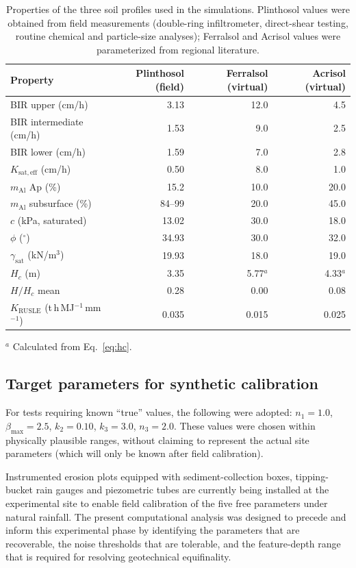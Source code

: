 \documentclass[preprint,review,12pt,authoryear]{elsarticle}
\begin{document}
\begin{table}[htbp]
\centering
\caption{Properties of the three soil profiles used in the simulations. Plinthosol values were obtained from field measurements (double-ring infiltrometer, direct-shear testing, routine chemical and particle-size analyses); Ferralsol and Acrisol values were parameterized from regional literature.}
\label{tab:profiles}
\small
\begin{tabular}{@{}l r r r@{}}
\toprule
Property & Plinthosol (field) & Ferralsol (virtual) & Acrisol (virtual) \\
\midrule
BIR upper (cm/h) & 3.13 & 12.0 & 4.5 \\
BIR intermediate (cm/h) & 1.53 & 9.0 & 2.5 \\
BIR lower (cm/h) & 1.59 & 7.0 & 2.8 \\
$K_{\mathrm{sat,eff}}$ (cm/h) & 0.50 & 8.0 & 1.0 \\
$m_{\mathrm{Al}}$ Ap (\%) & 15.2 & 10.0 & 20.0 \\
$m_{\mathrm{Al}}$ subsurface (\%) & 84--99 & 20.0 & 45.0 \\
$c$ (kPa, saturated) & 13.02 & 30.0 & 18.0 \\
$\phi$ ($^\circ$) & 34.93 & 30.0 & 32.0 \\
$\gamma_{\mathrm{sat}}$ (kN/m$^3$) & 19.93 & 18.0 & 19.0 \\
$H_c$ (m) & 3.35 & 5.77$^a$ & 4.33$^a$ \\
$H/H_c$ mean & 0.28 & 0.00 & 0.08 \\
$K_{\mathrm{RUSLE}}$ (t\,h\,MJ$^{-1}$\,mm$^{-1}$) & 0.035 & 0.015 & 0.025 \\
\bottomrule
\end{tabular}

\noindent $^a$ Calculated from Eq.~\ref{eq:hc}.
\end{table}

\subsection{Target parameters for synthetic calibration}

For tests requiring known ``true'' values, the following were adopted: $n_1 = 1.0$, $\beta_{\max} = 2.5$, $k_2 = 0.10$, $k_3 = 3.0$, $n_3 = 2.0$. These values were chosen within physically plausible ranges, without claiming to represent the actual site parameters (which will only be known after field calibration).

Instrumented erosion plots equipped with sediment-collection boxes, tipping-bucket rain gauges and piezometric tubes are currently being installed at the experimental site to enable field calibration of the five free parameters under natural rainfall. The present computational analysis was designed to precede and inform this experimental phase by identifying the parameters that are recoverable, the noise thresholds that are tolerable, and the feature-depth range that is required for resolving geotechnical equifinality.
\end{document}
